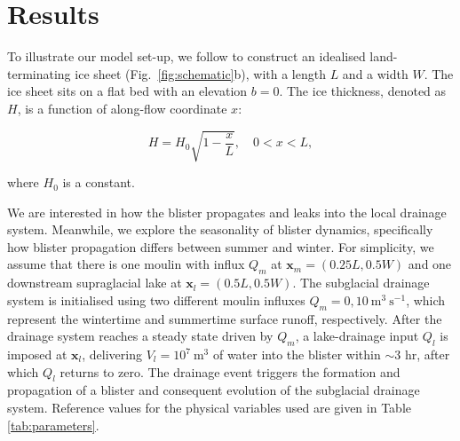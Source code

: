 \documentclass[draft]{agujournal2019}
\newcommand{\tabref}[1]{Table \ref{#1}}
\begin{document}
\section{Results}\label{sec:results}
To illustrate our model set-up, we follow  to construct an idealised land-terminating ice sheet (Fig.~\ref{fig:schematic}b), with a length $L$ and a width $W$. The ice sheet sits on a flat bed with an elevation $b=0$. The ice thickness, denoted as $H$, is a function of along-flow coordinate $x$:
\begin{linenomath*}
\begin{equation}
    H = H_0\sqrt{1-\frac{x}{L}},\quad 0<x<L,
\end{equation}
\end{linenomath*}
where $H_0$ is a constant.

We are interested in how the blister propagates and leaks into the local drainage system. Meanwhile, we explore the seasonality of blister dynamics, specifically how blister propagation differs between summer and winter. For simplicity, we assume that there is one moulin with influx $Q_m$ at $\boldsymbol{x}_m=(0.25L,0.5W)$ and one downstream supraglacial lake at $\boldsymbol{x}_l=(0.5L,0.5W)$. The subglacial drainage system is initialised using two different moulin influxes $Q_m=0,10~\text{m}^3~\text{s}^{-1}$, which represent the wintertime and summertime surface runoff, respectively. After the drainage system reaches a steady state driven by $Q_m$, a lake-drainage input $Q_l$ is imposed at $\boldsymbol{x}_l$, delivering $V_l=10^{7}~\text{m}^3$ of water into the blister within $\sim3$ hr, after which $Q_l$ returns to zero. The drainage event triggers the formation and propagation of a blister and consequent evolution of the subglacial drainage system. Reference values for the physical variables used are given in \tabref{tab:parameters}.
\end{document}
